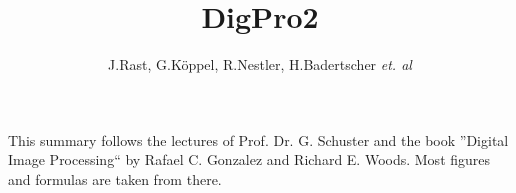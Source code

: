 \documentclass{scrartcl}
\title{DigPro2}
\author{J.Rast, G.Köppel, R.Nestler, H.Badertscher \textit{et. al}}
\begin{document}

\lstset{language=Matlab}

\begin{titlepage}
	\maketitle
	\vfill
	\hspace{2cm}
	\begin{minipage}{0.6\linewidth}
		This summary follows the lectures of Prof. Dr. G. Schuster and the book
		''Digital Image Processing`` by Rafael C. Gonzalez and Richard E. Woods. Most
		figures and formulas are taken from there.
	\end{minipage}
\end{titlepage}

\setcounter{tocdepth}{2}
\tableofcontents
\newpage

\setcounter{section}{8}




%
\end{document}
